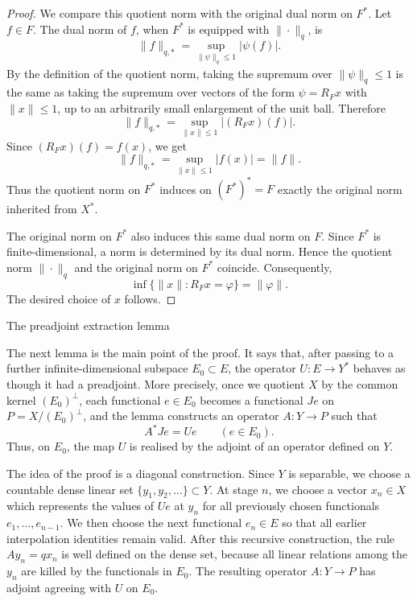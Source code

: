 \documentclass[11pt,reqno]{amsart}
\makeatletter
\theoremstyle{plain}
\theoremstyle{definition}
\newcounter{problempaper}
\newenvironment{problempaperbody}{%
  \setcounter{subsection}{0}%
  \setcounter{subsubsection}{0}%
  \setcounter{paragraph}{0}%
  \renewcommand{\thesubsection}{\arabic{subsection}}%
  \renewcommand{\thesubsubsection}{\thesubsection.\arabic{subsubsection}}%
  \renewcommand{\theparagraph}{\thesubsubsection.\arabic{paragraph}}%
  \let\problem@outersection\section
  \let\problem@outersubsection\subsection
  \let\problem@outersubsubsection\subsubsection
  \let\problem@outerparagraph\paragraph
  \let\section\problem@papersection
  \let\subsection\problem@papersubsection
  \let\subsubsection\problem@papersubsubsection
}{%
  \let\section\problem@outersection
  \let\subsection\problem@outersubsection
  \let\subsubsection\problem@outersubsubsection
  \let\paragraph\problem@outerparagraph
}
\newcommand{\problem@target}[2]{%
  \hypertarget{problem-\theproblempaper-#1-#2}{}%
}
\newcommand{\problem@paperheading}[3]{%
  \par\bigskip
  \problem@target{#1}{#2}%
  \noindent{\large\bfseries #2.\quad #3\par}%
  \nobreak\smallskip
}
\newcommand{\problem@papersubheading}[3]{%
  \par\medskip
  \problem@target{#1}{#2}%
  \noindent{\normalsize\bfseries #2.\quad #3\par}%
  \nobreak\smallskip
}
\newcommand{\problem@papersubsubheading}[3]{%
  \par\smallskip
  \problem@target{#1}{#2}%
  \noindent{\normalsize\itshape #2.\quad #3.\ }%
}
\def\problem@papersection{%
  \@ifstar{\problem@papersectionstar}{\problem@papersectionnostar}%
}
\def\problem@papersectionstar#1{%
  \par\bigskip\noindent{\large\bfseries #1\par}\nobreak\smallskip
}
\def\problem@papersectionnostar#1{%
  \refstepcounter{subsection}%
  \setcounter{subsubsection}{0}%
  \setcounter{paragraph}{0}%
  \problem@paperheading{section}{\thesubsection}{#1}%
  \problem@writecontentsline{section}{\thesubsection}{#1}%
}
\def\problem@papersubsection{%
  \@ifstar{\problem@papersubsectionstar}{\problem@papersubsectionnostar}%
}
\def\problem@papersubsectionstar#1{%
  \par\medskip\noindent{\normalsize\bfseries #1\par}\nobreak\smallskip
}
\def\problem@papersubsectionnostar#1{%
  \refstepcounter{subsubsection}%
  \setcounter{paragraph}{0}%
  \problem@papersubheading{subsection}{\thesubsubsection}{#1}%
  \problem@writecontentsline{subsection}{\thesubsubsection}{#1}%
}
\def\problem@papersubsubsection{%
  \@ifstar{\problem@papersubsubsectionstar}{\problem@papersubsubsectionnostar}%
}
\def\problem@papersubsubsectionstar#1{%
  \par\smallskip\noindent{\normalsize\itshape #1.\ }%
}
\def\problem@papersubsubsectionnostar#1{%
  \refstepcounter{paragraph}%
  \problem@papersubsubheading{subsubsection}{\theparagraph}{#1}%
  \problem@writecontentsline{subsubsection}{\theparagraph}{#1}%
}
\newcommand{\problem@writecontentsline}[3]{%
  \begingroup
  \protected@write\@auxout{}{%
    \string\problemcontentsentry{\theproblempaper}{#1}{#2}{#3}{\thepage}%
  }%
  \endgroup
}
\newcommand{\problemcontentsentry}[5]{%
  \@ifundefined{problemcontents@#1}{%
    \expandafter\gdef\csname problemcontents@#1\endcsname{}%
  }{}%
  \expandafter\g@addto@macro\csname problemcontents@#1\endcsname{%
    \problemcontentsline{#1}{#2}{#3}{#4}{#5}%
  }%
}
\newcommand{\problemcontentslink}[4]{%
  \hyperlink{problem-#1-#2-#3}{#4}%
}
\newcommand{\problemcontentsline}[5]{%
  \ifstrequal{#2}{section}{%
    \par\noindent
    \problemcontentslink{#1}{#2}{#3}{\makebox[2.5em][l]{#3}#4}%
    \nobreak\dotfill
    \problemcontentslink{#1}{#2}{#3}{#5}\par
  }{%
    \ifstrequal{#2}{subsection}{%
      \par\noindent\hspace*{1.5em}%
      \problemcontentslink{#1}{#2}{#3}{\makebox[3.5em][l]{#3}#4}%
      \nobreak\dotfill
      \problemcontentslink{#1}{#2}{#3}{#5}\par
    }{%
      \par\noindent\hspace*{3em}%
      \problemcontentslink{#1}{#2}{#3}{\makebox[4.5em][l]{#3}#4}%
      \nobreak\dotfill
      \problemcontentslink{#1}{#2}{#3}{#5}\par
    }%
  }%
}
\makeatother
\begin{document}
\begin{problempaperbody}
\begin{proof}
We compare this quotient norm with the original dual norm on $F^*$. Let $f\in F$. The dual norm of $f$, when $F^*$ is equipped with $\|\cdot\|_q$, is
\begin{equation*}
        \|f\|_{q,*}=\sup_{\|\psi\|_q\leq 1}|\psi(f)|.
\end{equation*}
By the definition of the quotient norm, taking the supremum over $\|\psi\|_q\leq1$ is the same as taking the supremum over vectors of the form $\psi=R_Fx$ with $\|x\|\leq1$, up to an arbitrarily small enlargement of the unit ball. Therefore
\begin{equation*}
        \|f\|_{q,*}=\sup_{\|x\|\leq 1}|(R_Fx)(f)|.
\end{equation*}
Since $(R_Fx)(f)=f(x)$, we get
\begin{equation*}
        \|f\|_{q,*}=\sup_{\|x\|\leq 1}|f(x)|=\|f\|.
\end{equation*}
Thus the quotient norm on $F^*$ induces on $(F^*)^*=F$ exactly the original norm inherited from $X^*$.

The original norm on $F^*$ also induces this same dual norm on $F$. Since $F^*$ is finite-dimensional, a norm is determined by its dual norm. Hence the quotient norm $\|\cdot\|_q$ and the original norm on $F^*$ coincide. Consequently,
\begin{equation*}
        \inf\{\|x\|:R_Fx=\varphi\}=\|\varphi\|.
\end{equation*}
The desired choice of $x$ follows.
\end{proof}

\section{The preadjoint extraction lemma}
\label{p4:sec:preadjoint-extraction}

The next lemma is the main point of the proof. It says that, after passing to a further infinite-dimensional subspace $E_0\subset E$, the operator $U \colon E\to Y^*$ behaves as though it had a preadjoint. More precisely, once we quotient $X$ by the common kernel $(E_0)^\perp$, each functional $e\in E_0$ becomes a functional $Je$ on $P=X/(E_0)^\perp$, and the lemma constructs an operator $A \colon Y\to P$ such that
\begin{equation*}
        A^*Je=Ue \qquad(e\in E_0).
\end{equation*}
Thus, on $E_0$, the map $U$ is realised by the adjoint of an operator defined on $Y$.

The idea of the proof is a diagonal construction. Since $Y$ is separable, we choose a countable dense linear set $\{y_1,y_2,\ldots\}\subset Y$. At stage $n$, we choose a vector $x_n\in X$ which represents the values of $Ue$ at $y_n$ for all previously chosen functionals $e_1,\ldots,e_{n-1}$. We then choose the next functional $e_n\in E$ so that all earlier interpolation identities remain valid. After this recursive construction, the rule $Ay_n=qx_n$ is well defined on the dense set, because all linear relations among the $y_n$ are killed by the functionals in $E_0$. The resulting operator $A \colon Y\to P$ has adjoint agreeing with $U$ on $E_0$.


\end{problempaperbody}
\end{document}
